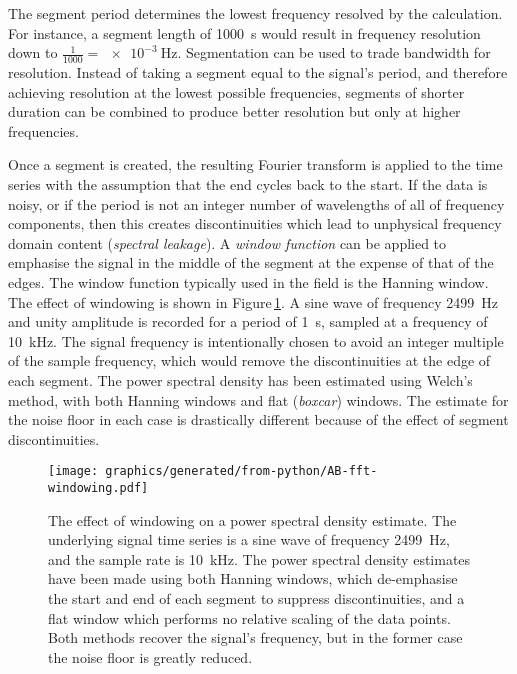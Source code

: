The segment period determines the lowest frequency resolved by the calculation. For instance, a segment length of \SI{1000}{\second} would result in frequency resolution down to $\frac{1}{1000} = \SI{e-3}{\hertz}$. Segmentation can be used to trade bandwidth for resolution. Instead of taking a segment equal to the signal's period, and therefore achieving resolution at the lowest possible frequencies, segments of shorter duration can be combined to produce better resolution but only at higher frequencies.

Once a segment is created, the resulting Fourier transform is applied to the time series with the assumption that the end cycles back to the start. If the data is noisy, or if the period is not an integer number of wavelengths of all of frequency components, then this creates discontinuities which lead to unphysical frequency domain content (\emph{spectral leakage}). A \emph{window function} can be applied to emphasise the signal in the middle of the segment at the expense of that of the edges. The window function typically used in the field is the Hanning window. The effect of windowing is shown in Figure\,\ref{fig:fft-windowing}. A sine wave of frequency \SI{2499}{\hertz} and unity amplitude is recorded for a period of \SI{1}{\second}, sampled at a frequency of \SI{10}{\kilo\hertz}. The signal frequency is intentionally chosen to avoid an integer multiple of the sample frequency, which would remove the discontinuities at the edge of each segment. The power spectral density has been estimated using Welch's method, with both Hanning windows and flat (\emph{boxcar}) windows. The estimate for the noise floor in each case is drastically different because of the effect of segment discontinuities.

\begin{figure}
  \centering
  \texttt{[image: graphics/generated/from-python/AB-fft-windowing.pdf]}
  \caption[The effect of windowing on a power spectral density estimate]{\label{fig:fft-windowing}The effect of windowing on a power spectral density estimate. The underlying signal time series is a sine wave of frequency \SI{2499}{\hertz}, and the sample rate is \SI{10}{\kilo\hertz}. The power spectral density estimates have been made using both Hanning windows, which de-emphasise the start and end of each segment to suppress discontinuities, and a flat window which performs no relative scaling of the data points. Both methods recover the signal's frequency, but in the former case the noise floor is greatly reduced.}
\end{figure}

